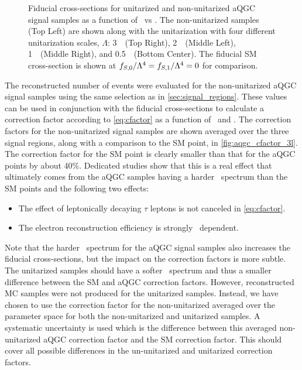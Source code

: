 \begin{figure}[ht!]
\caption{Fiducial cross-sections for unitarized and non-unitarized aQGC signal samples as a function of \fszero~vs \fsone.
The non-unitarized samples (Top Left) are shown along with the unitarization with 
four different unitarization scales, $\Lambda$: 3~\TeV~(Top Right),
2~\TeV~(Middle Left), 1~\TeV~(Middle Right), and 0.5~\TeV~(Bottom Center).
The fiducial SM cross-section is shown at $f_{S,0}/\Lambda^4=f_{S,1}/\Lambda^4=0$ for comparison.}
\label{fig:aqgc_fiducial_xsec_3l}
\end{figure}



The reconstructed number of events were evaluated for the non-unitarized
aQGC signal samples using the same selection as in \sec\ref{sec:signal_regions}.
These values can be used in conjunction with the fiducial cross-sections
to calculate a correction factor according to \eqn\eqref{eq:cfactor} as a function 
of \fszero~and \fsone. The correction factors for the non-unitarized signal samples
are shown averaged over the three signal regions, along with a comparison to the SM point,
in \fig\ref{fig:aqgc_cfactor_3l}.
The correction factor for the SM point is clearly smaller than that for the aQGC
points by about 40\%. Dedicated studies show that this is a real effect 
that ultimately comes from the aQGC samples having a harder \pt~spectrum
than the SM points and the following two effects:
\begin{itemize}
\item The effect of leptonically decaying $\tau$ leptons is not 
canceled in \eqn\eqref{eq:cfactor}.
\item The electron reconstruction efficiency is strongly \pt~dependent.
\end{itemize}
Note that the harder \pt~spectrum for the aQGC signal samples also 
increases the fiducial cross-sections, but the impact on the correction factors is more subtle.
The unitarized samples should have a softer \pt~spectrum and thus a
smaller difference between the SM and aQGC correction factors. However,
reconstructed MC samples were not produced for the unitarized samples.
Instead, we have chosen to use the 
correction factor for the non-unitarized averaged over the parameter space for 
both the non-unitarized and unitarized samples.  A systematic uncertainty  
is used which is the difference between this averaged non-unitarized
aQGC correction factor and the SM correction factor. This should cover all possible differences
in the un-unitarized and unitarized correction factors.

